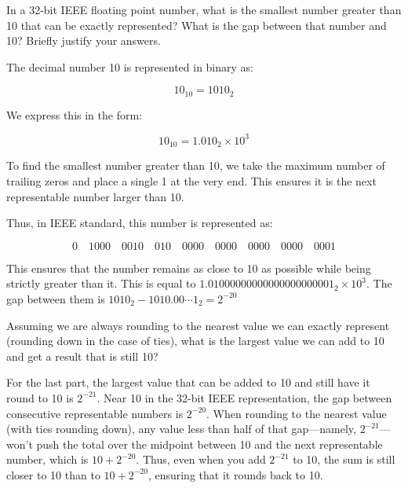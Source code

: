 \documentclass[12pt, letterpaper]{article}
\begin{document}
\color{\TextColor}
\pagecolor{\colormode}

\renewcommand{\pbcolormain}{clmscol!60!white}
\renewcommand{\pbcolorsecond}{clmscol!30!white}
\renewcommand{\stepsub}{
    \stepcounter{subproblemcounter}%
    \color{\TextColor}\arabic{subproblemcounter}.
}

\setlength{\parindent}{0pt}
\pagestyle{fancy}
\fancyhf{}
\fancyhead[ROE]{\color{\TextColor}\thepage}


\begin{subproblem}{}
    In a 32-bit IEEE floating point number, what is the smallest number greater than 10 that can be exactly represented?  What is the gap between that number and 10?  Briefly justify your answers.
\end{subproblem}
The decimal number 10 is represented in binary as:

\[
10_{10} = 1010_2
\]

We express this in the form:

\[
10_{10} = 1.010_2 \times 10^3
\]

To find the smallest number greater than 10, we take the maximum number of trailing zeros and place a single 1 at the very end. This ensures it is the next representable number larger than 10.

Thus, in IEEE standard, this number is represented as:

\[
0 \quad 1000 \quad 0010 \quad 010 \quad 0000 \quad 0000 \quad 0000 \quad 0000 \quad 0001
\]

This ensures that the number remains as close to 10 as possible while being strictly greater than it. This is equal to $1.01000000000000000000001_2 \times 10^3$. The gap between them is $1010_2-1010.00\cdots1_2=2^{-20}$

\begin{subproblem}{}
    Assuming we are always rounding to the nearest value we can exactly represent (rounding down in the case of ties), what is the largest value we can add to 10 and get a result that is still 10?
\end{subproblem}

For the last part, the largest value that can be added to 10 and still have it round to 10 is \(2^{-21}\). Near 10 in the 32-bit IEEE representation, the gap between consecutive representable numbers is \(2^{-20}\). When rounding to the nearest value (with ties rounding down), any value less than half of that gap—namely, \(2^{-21}\)—won't push the total over the midpoint between 10 and the next representable number, which is \(10 + 2^{-20}\). Thus, even when you add \(2^{-21}\) to 10, the sum is still closer to 10 than to \(10 + 2^{-20}\), ensuring that it rounds back to 10.
\end{document}
